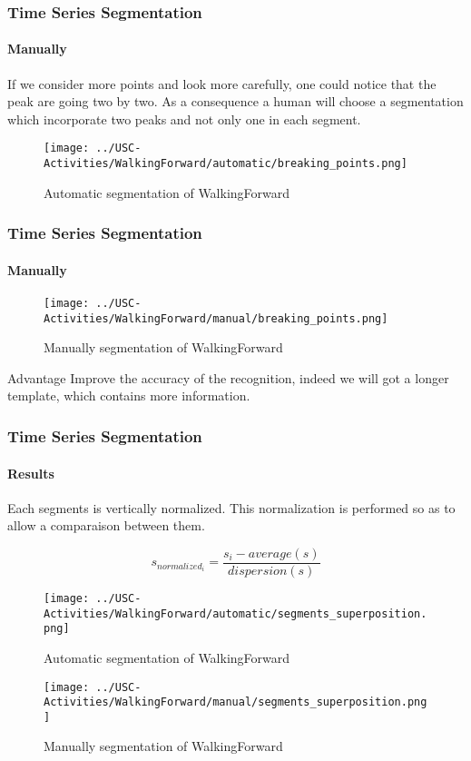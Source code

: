 \documentclass[11pt, sans, handout]{beamer}
\begin{document}
\begin{frame}
	\frametitle{Time Series Segmentation}
	\framesubtitle{Manually}
	
	If we consider more points and look more carefully, one could notice that the peak  are going two by two. As a consequence a human will choose a segmentation which incorporate two peaks and not only one in each segment. 
		
	\begin{figure}
      \texttt{[image: ../USC-Activities/WalkingForward/automatic/breaking\_points.png]}
      \caption{Automatic segmentation of WalkingForward}
    \end{figure}
\end{frame}

\begin{frame}
	\frametitle{Time Series Segmentation}
	\framesubtitle{Manually}
	
	\begin{figure} 	
      \texttt{[image: ../USC-Activities/WalkingForward/manual/breaking\_points.png]}
      \caption{Manually segmentation of WalkingForward}
	\end{figure}
	
	\begin{exampleblock}{Advantage}
	Improve the accuracy of the recognition, indeed we will got a longer template, which contains more information.
	\end{exampleblock}
	
\end{frame}

\begin{frame}
	\frametitle{Time Series Segmentation}
	\framesubtitle{Results}
	
 Each segments is vertically normalized. This normalization is performed so as to allow a comparaison between them.
 
 	\[ s_{normalized_i} = \frac{s_i - average(s)}{dispersion(s)} \]
		
	\begin{figure}
   	\begin{minipage}[c]{.46\linewidth}
      \texttt{[image: ../USC-Activities/WalkingForward/automatic/segments\_superposition.png]}
      \caption{Automatic segmentation of WalkingForward}
   	\end{minipage} \hfill
   	\begin{minipage}[c]{.46\linewidth}
      \texttt{[image: ../USC-Activities/WalkingForward/manual/segments\_superposition.png]}
      \caption{Manually segmentation of WalkingForward}
  	\end{minipage}
	\end{figure}
	
\end{frame}
\end{document}
